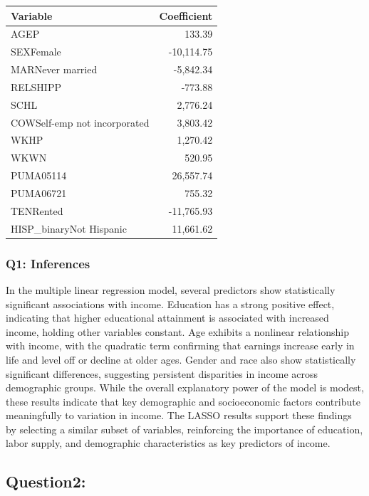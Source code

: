 \documentclass[
  letterpaper,
  DIV=11,
  numbers=noendperiod]{scrartcl}
\begin{document}
\begin{table}
\fontsize{12.0pt}{14.0pt}\selectfont
\begin{tabular*}{\linewidth}{@{\extracolsep{\fill}}lr}
\toprule
Variable & Coefficient \\ 
\midrule\addlinespace[2.5pt]
AGEP & 133.39 \\ 
SEXFemale & -10,114.75 \\ 
MARNever married & -5,842.34 \\ 
RELSHIPP & -773.88 \\ 
SCHL & 2,776.24 \\ 
COWSelf-emp not incorporated & 3,803.42 \\ 
WKHP & 1,270.42 \\ 
WKWN & 520.95 \\ 
PUMA05114 & 26,557.74 \\ 
PUMA06721 & 755.32 \\ 
TENRented & -11,765.93 \\ 
HISP\_binaryNot Hispanic & 11,661.62 \\ 
\bottomrule
\end{tabular*}
\end{table}

\subsubsection{Q1: Inferences}\label{q1-inferences}

In the multiple linear regression model, several predictors show
statistically significant associations with income. Education has a
strong positive effect, indicating that higher educational attainment is
associated with increased income, holding other variables constant. Age
exhibits a nonlinear relationship with income, with the quadratic term
confirming that earnings increase early in life and level off or decline
at older ages. Gender and race also show statistically significant
differences, suggesting persistent disparities in income across
demographic groups. While the overall explanatory power of the model is
modest, these results indicate that key demographic and socioeconomic
factors contribute meaningfully to variation in income. The LASSO
results support these findings by selecting a similar subset of
variables, reinforcing the importance of education, labor supply, and
demographic characteristics as key predictors of income.

\subsection{Question2:}\label{question2}
\end{document}
